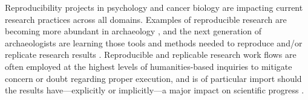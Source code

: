 \documentclass[]{interact}
\theoremstyle{plain}%
\theoremstyle{definition}
\theoremstyle{remark}
\begin{document}
Reproducibility projects in psychology and cancer biology are impacting
current research practices across all domains. Examples of reproducible
research are becoming more abundant in archaeology
\citep{RN9022,RN7818,RN10578,RN10576,RN8510,RN11097}, and the next
generation of archaeologists are learning those tools and methods needed
to reproduce and/or replicate research results \citep{RN10579}.
Reproducible and replicable research work flows are often employed at
the highest levels of humanities-based inquiries to mitigate concern or
doubt regarding proper execution, and is of particular import should the
results have---explicitly or implicitly---a major impact on scientific
progress \citep{RN10580}.






\end{document}
